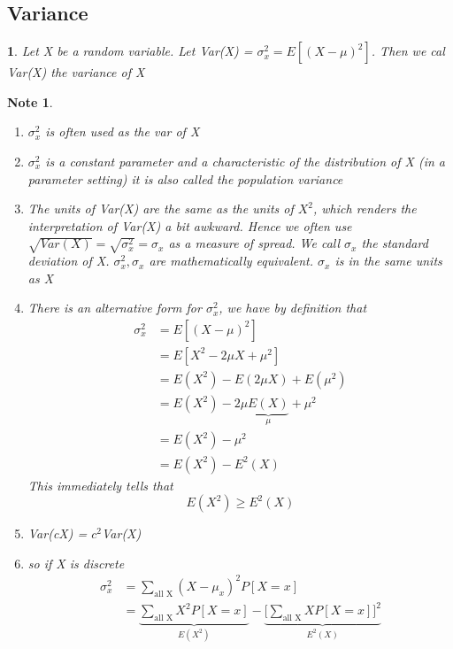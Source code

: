 \documentclass[11pt]{article}
\newtheorem*{note}{Note}
\newtheorem{definition}{\framebox{DEF}}[section]
\newcommand\tab[1][1cm]{\hspace*{#1}}
\begin{document}
        \subsection{Variance}
            \begin{definition}
                Let X be a random variable. Let Var(X) = $\sigma^2_x = E[(X- \mu)^2]$. Then we cal Var(X) the variance of X
            \end{definition}
            \begin{note}\tab
                \begin{enumerate}
                    \item $\sigma^2_x$ is often used as the var of X
                    \item $\sigma^2_x$ is a constant parameter and a characteristic of the distribution of X (in a parameter setting) it is also called the population variance
                    \item The units of Var(X) are the same as the units of $X^2$, which renders the interpretation of Var(X) a bit awkward. 
                            Hence we often use $\sqrt{Var(X)} = \sqrt{\sigma^2_x} = \sigma_x$ as a measure of spread. We call $\sigma_x$ the standard deviation of X. 
                            $\sigma^2_x, \sigma_x$ are mathematically equivalent. $\sigma_x$ is in the same units as X
                    \item There is an alternative form for $\sigma^2_x$, we have by definition that 
                        \begin{align*}
                            \sigma^2_x      &=  E[(X - \mu)^2]\\
                                            &=  E[X^2 - 2\mu X + \mu^2]\\
                                            &=  E(X^2) - E(2\mu X) + E(\mu^2)\\
                                            &=  E(X^2) - 2\mu \underbrace{E(X)}_{\mu} + \mu^2\\
                                            &=  E(X^2) - \mu^2\\
                                            &=  E(X^2) - E^2(X)
                        \end{align*}
                        This immediately tells that \[E(X^2) \geq E^2(X) \tag{since $E[(X-\mu)^2]>$ 0} \]
                    \item Var(cX) = $c^2$Var(X) 
                    \item so if X is discrete 
                        \begin{align*}
                            \sigma^2_x  &= \sum_{\text{all X}} (X - \mu_x)^2 P[X = x] \\
                                        &= \underbrace{\sum_{\text{all X}} X^2 P[X = x]}_{E(X^2)} - \underbrace{\big[\sum_{\text{all X}} X P[X = x] \big]^2}_{E^2(X)}
                        \end{align*}
                \end{enumerate}
            \end{note}
            
\end{document}
